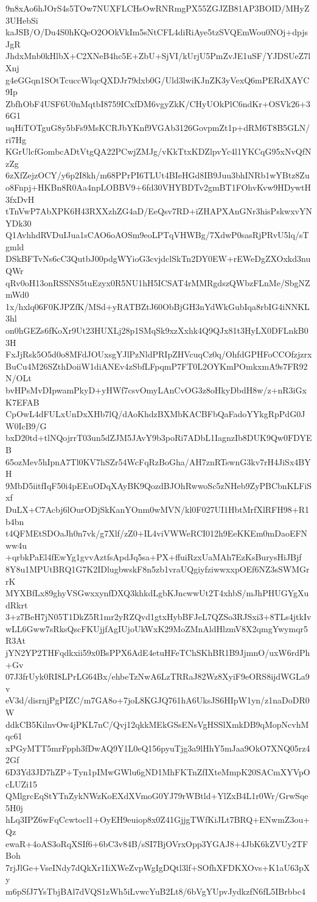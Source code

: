9n8xAo6hJOrS4s5TOw7NUXFLCHsOwRNRmgPX55ZGJZB81AP3BOID/MHyZ3UHebSi
kaJSB/O/Du4S0hKQeO2OOkVkIm5sNtCFL4diRiAye5tzSVQEmWou0NOj+dpjsJgR
JhdxMnb0kHlbX+C2XNeB4hc5E+ZbU+SjVI/kUrjU5PmZvJE1uSF/YJDSUeZ7lXnj
g4eGGqn1SOtTcuccWlqcQXDJr79dxb0G/Uld3lwiKJnZK3yVexQ6mPERdXAYC9Ip
ZbfhObF4USF6U0nMqtbI8759ICxfDM6vgyZkK/CHyUOkPlC6ndKr+OSVk26+36G1
uqHiTOTguG8y5bFs9MsKCRJbYKnf9VGAb3126GovpmZt1p+dRM6T8B5GLN/ri7Hg
KGrUlcfGombcADtVtgQA22PCwjZMJg/vKkTtxKDZlpvYc4l1YKCqG95xNvQfNzZg
6zXfZejzOCY/y6p2I8kh/m68PPrPI6TLUt4BIeHGd8IB9Juu3bhINRb1wYBtz8Zu
o8Fnpj+HKBn8R0Aa4npLOBBV9+6fd30VHYBDTv2gmBT1FOhvKvw9HDywtH3fxDvH
tTnVwP7AbXPK6H43RXXzhZG4aD/EeQsv7RD+iZHAPXAnGNr3hisPskwxvYNYDk30
Q1AvhhdRVDuIJua1sCAO6oAOSm9eoLPTqVHWBg/7XdwP0sasRjPRvU5lq/sTgmld
DSkBFTvNs6cC3QutbJ00pdgWYioG3cvjdclSkTn2DY0EW+rEWeDgZXOxkd3nuQWr
qRv0oH13onRSSNS5tuEzyx0R5NU1hH5ICSAT4rMMRgdszQWbzFLnMe/SbgNZmWd0
1x/hxlq06F0KJPZfK/MSd+yRATBZtJ60ObBjGH3nYdWkGubIqa8rbIG4iNNKL3hl
on0hGEZs6fKoXr9Ut23HUXLj28p1SMqSk9xzXxhk4Q9QJx81t3HyLX0DFLnkB03H
FxJjRsk5O5d0o8MFdJOUxsgYJlPzNldPRIpZHVcuqCz0q/OhfdGPHFoCCOfzjzrx
BuCu4M26SZthDoiiW1diANEv4zSbfLFpqmP7FT0L2OYKmPOmkxmA9s7FR92N/OLt
bvHPsMvDIpwamPkyD+yHWf7csvOmyLAnCvOG3z8oHkyDbdH8w/z+nR3iGxK7EFAB
CpOwL4dFULxUnDxXHb7lQ/dAoKhdzBXMbKACBFbQaFadoYYkgRpPdG0JW0IcB9/G
bxD20td+tlNQojrrT03un5dZJM5JAvY9b3poRi7ADbL1IagnzIb8DUK9Qw0FDYEB
65ozMev5hIpnA7Tl0KV7hSZr54WcFqRzBoGha/AH7znRTswnG3kv7rH4JiSx4BYH
9MbD5iitfIqF50i4pEEuODqXAyBK9QozdBJOhRwwoSc5zNHeb9ZyPBCbnKLFiSxf
DuLX+C7Acbj6lOurODjSkKanYOnm0wMVN/kl0F027UI1HbtMrfXlRFH98+R1b4bn
t4QFMEtSDOaJh0n7vk/g7Xlf/zZ0+IL4viVWWeRCI012h9EeKKEm0mDaoEFNww4u
+qrbkPaEl4fEwYg1gvvAztfsApdJq5sa+PX+ffuiRzxUaMAh7EzKsBurysHiJBjf
8Y8u1MPUtBRQ1G7K2IDlugbwskF8n5zb1vraUQgiyfziwwxxpOEf6NZ3sSWMGrrK
MYXBfLx89ghyVSGwxxynfDXQ3khkdLgbKJncwwUt2T4xhbS/mJhPHUGYgXudRkrt
3+z7BeH7jN05T1DkZ5R1mr2yRZQvd1gtxHybBFJeL7QZSo3RJSxi3+8TLs4jtkIv
wLL6Gww7sRksQscFKUjjfAgIUjoUkWxK29MoZMnAldHlzmV8X2qmgYwymqr5R3At
jYN2YP2THFqdkxii59x0BsPPX6AdE4etuHFeTChSKhBR1B9JjmnO/uxW6rdPh+Gv
07J3frUyk0RI8LPrLG64Bx/ehbeTzNwA6LzTRRaJ82Wz8XyiF9eORS8ijdWGLa9v
eV3d/disrnjPgPIZC/m7GA8o+7joL8KGJQ761hA6UksJS6HIpW1yn/z1naDoDR0W
ddkCB5KilnvOw4jPKL7nC/Qvj12qkkMEkGSsENsVgHSSlXmkDB9qMopNcvhMqc61
xPGyMTT5mrFpph3fDwAQ9Y1L0eQ156pyuTjg3a9lHhY5mJaa9OkO7XNQ05rz42Gf
6D3Yd3JD7hZP+Tyn1pIMwGWlu6gND1MhFKTnZfIXteMmpK20SACmXYVpOcLUZi15
QMlgrcEqStYTnZykNWzKoEXdXVmoG0YJ79rWBtld+YlZxB4L1r0Wr/GrwSqe5H0j
hLq3IPZ6wFqCcwtocl1+OyEH9euiop8x0Z41GjjgTWfKiJLt7BRQ+ENwmZ3ou+Qz
ewaR+4oAS3oRqXSIf6+6bC3v84B/sSI7BjOVrxOpp3YGAJ8+4JbK6kZVUy2TFBoh
7rjJlGe+VseINdy7dQkXr1IiXWeZvpWgIgDQtl3lf+SOfhXFDKXOvs+K1aU63pXy
m6pSfJ7YsTbjBAl7dVQS1zWh5iLvwcYuB2Lt8/6bVgYUpvJydkzfN6fL5IBrbbc4
